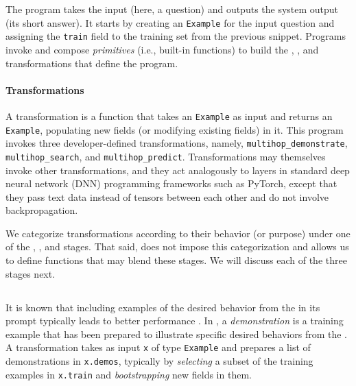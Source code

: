 The program takes the input (here, a question) and outputs the system output (its short answer). It starts by creating an \texttt{Example} for the input question and assigning the \texttt{train} field to the training set from the previous snippet. Programs invoke and compose \DSP \textit{primitives} (i.e., built-in functions) to build the \demonstrate, \search, and \predict transformations that define the program.

\vspace{-2mm}
\paragraph{Transformations} A transformation is a function that takes an \texttt{Example} as input and returns an  \texttt{Example}, populating new fields (or modifying existing fields) in it. 
This program invokes three developer-defined transformations, namely, \texttt{multihop\_demonstrate}, \texttt{multihop\_search}, and \texttt{multihop\_predict}. Transformations may themselves invoke other transformations, and they act analogously to layers in standard deep neural network (DNN) programming frameworks such as PyTorch, except that they pass text data instead of tensors between each other and do not involve backpropagation.

We categorize transformations according to their behavior (or purpose) under one of the \demonstrate, \search, and \predict stages. That said, \DSP does not impose this categorization and allows us to define functions that may blend these stages. We will discuss each of the three stages next.

\subsection{\demonstrate}
\label{sec:dsp:demonstrate}




 It is known that including examples of the desired behavior from the \LM{} in its prompt typically leads to better performance \cite{brown2020language}. In \DSP, a \textit{demonstration} is a training example that has been prepared to illustrate specific desired behaviors from the \LM{}. A \demonstrate transformation takes as input \texttt{x} of type \texttt{Example} and prepares a list of demonstrations in \texttt{x.demos}, typically by \textit{selecting} a subset of the training examples in \texttt{x.train} and \textit{bootstrapping} new fields in them.

\vspace{-2mm}
